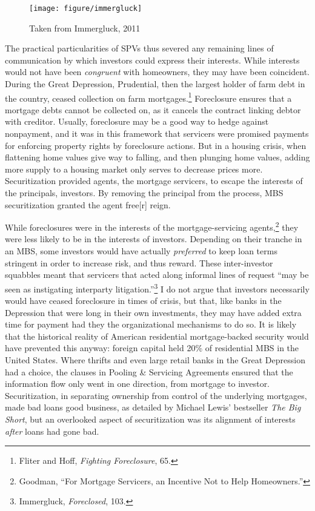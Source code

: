 \documentclass[
]{article}
\let\rmarkdownfootnote\footnote%
\def\footnote{\protect\rmarkdownfootnote}
\begin{document}
\begin{figure}

{\centering \texttt{[image: figure/immergluck]} 

}

\caption{Taken from Immergluck, 2011}\label{fig:immergluck}
\end{figure}

The practical particularities of SPVs thus severed any remaining lines
of communication by which investors could express their interests. While
interests would not have been \emph{congruent} with homeowners, they may
have been coincident. During the Great Depression, Prudential, then the
largest holder of farm debt in the country, ceased collection on farm
mortgages.\footnote{Fliter and Hoff, \emph{Fighting Foreclosure}, 65.}
Foreclosure ensures that a mortgage debts cannot be collected on, as it
cancels the contract linking debtor with creditor. Usually, foreclosure
may be a good way to hedge against nonpayment, and it was in this
framework that servicers were promised payments for enforcing property
rights by foreclosure actions. But in a housing crisis, when flattening
home values give way to falling, and then plunging home values, adding
more supply to a housing market only serves to decrease prices more.
Securitization provided agents, the mortgage servicers, to escape the
interests of the principals, investors. By removing the principal from
the process, MBS securitization granted the agent free{[}r{]} reign.

While foreclosures were in the interests of the mortgage-servicing
agents,\footnote{Goodman, ``For Mortgage Servicers, an Incentive Not to
  Help Homeowners.''} they were less likely to be in the interests of
investors. Depending on their tranche in an MBS, some investors would
have actually \emph{preferred} to keep loan terms stringent in order to
increase risk, and thus reward. These inter-investor squabbles meant
that servicers that acted along informal lines of request ``may be seen
as instigating interparty litigation.''\footnote{Immergluck,
  \emph{Foreclosed}, 103.} I do not argue that investors necessarily
would have ceased foreclosure in times of crisis, but that, like banks
in the Depression that were long in their own investments, they may have
added extra time for payment had they the organizational mechanisms to
do so. It is likely that the historical reality of American residential
mortgage-backed security would have prevented this anyway: foreign
capital held 20\% of residential MBS in the United States. Where thrifts
and even large retail banks in the Great Depression had a choice, the
clauses in Pooling \& Servicing Agreements ensured that the information
flow only went in one direction, from mortgage to investor.
Securitization, in separating ownership from control of the underlying
mortgages, made bad loans good business, as detailed by Michael Lewis'
bestseller \emph{The Big Short}, but an overlooked aspect of
securitization was its alignment of interests \emph{after} loans had
gone bad.
\end{document}
